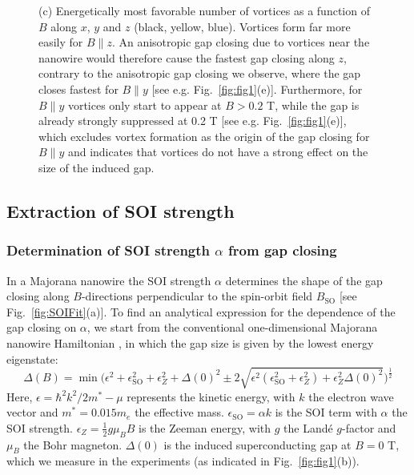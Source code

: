 \begin{figure}
\begin{center}
{(c) Energetically most favorable number of vortices as a function of $B$ along $x$, $y$ and $z$ (black, yellow, blue).
Vortices form far more easily for $B \parallel z$.
An anisotropic gap closing due to vortices near the nanowire would therefore cause the fastest gap closing along $z$, contrary to the anisotropic gap closing we observe, where the gap closes fastest for $B \parallel  y$ [see e.g.
Fig.~\ref{fig:fig1}(e)].
Furthermore, for $B \parallel y$ vortices only start to appear at $B > 0.2$ T, while the gap is already strongly suppressed at 0.2 T [see e.g.
Fig.~\ref{fig:fig1}(e)], which excludes vortex formation as the origin of the gap closing for $B \parallel y$ and indicates that vortices do not have a strong effect on the size of the induced gap.
}
\end{center}
\end{figure}

\subsection{Extraction of SOI strength}
\subsubsection{Determination of SOI strength $\alpha$ from gap closing}
In a Majorana nanowire the SOI strength $\alpha$ determines the shape of the gap closing along $B$-directions perpendicular to the spin-orbit field $B_{\mathrm{SO}}$ \cite{Heck2017,Pan2019} [see Fig.~\ref{fig:SOIFit}(a)].
To find an analytical expression for the dependence of the gap closing on $\alpha$, we start from the conventional one-dimensional Majorana nanowire Hamiltonian \cite{Lutchyn2010,Oreg2010}, in which the gap size is given by the lowest energy eigenstate:
\begin{equation}
\Delta(B) = \min \bigg( \epsilon^2 + \epsilon_{\mathrm{SO}}^2 + \epsilon_{Z}^2 + \Delta(0)^2 \pm 2 \sqrt{\epsilon^2 ( \epsilon_{\mathrm{SO}}^2+\epsilon_{Z}^2 ) + \epsilon_{Z}^2\Delta(0)^2} \bigg)^\frac{1}{2}
\end{equation}
Here, $\epsilon=\hbar^2k^2/2m^*-\mu$ represents the kinetic energy, with $k$ the electron wave vector and $m^*=0.015 m_e$ the effective mass.
$\epsilon_{\mathrm{SO}}=\alpha k$ is the SOI term with $\alpha$ the SOI strength.
$\epsilon_Z = \frac{1}{2}g\mu_BB$ is the Zeeman energy, with $g$ the Land\'e $g$-factor and $\mu_B$ the Bohr magneton.
$\Delta(0)$ is the induced superconducting gap at $B = 0$ T, which we measure in the experiments (as indicated in Fig.~\ref{fig:fig1}(b)).

